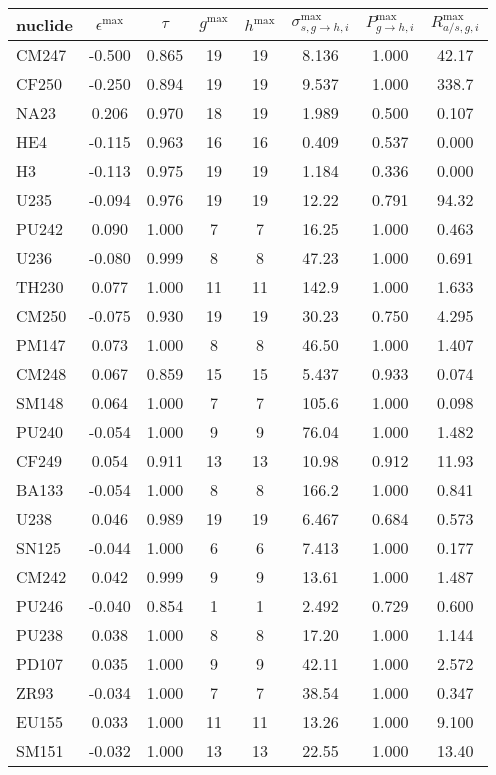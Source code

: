 \begin{tabular}{|l|ccccccc|}
\hline
nuclide & $\epsilon^{\max}$ & $\tau$ & $g^{\max}$ & $h^{\max}$ & $\sigma_{s,g\to h,i}^{\max}$ & $P_{g\to h,i}^{\max}$ & $R_{a/s,g,i}^{\max}$\\
\hline
CM247 & -0.500 & 0.865 & 19 & 19 & 8.136 & 1.000 & 42.17\\
CF250 & -0.250 & 0.894 & 19 & 19 & 9.537 & 1.000 & 338.7\\
NA23 & 0.206 & 0.970 & 18 & 19 & 1.989 & 0.500 & 0.107\\
HE4 & -0.115 & 0.963 & 16 & 16 & 0.409 & 0.537 & 0.000\\
H3 & -0.113 & 0.975 & 19 & 19 & 1.184 & 0.336 & 0.000\\
U235 & -0.094 & 0.976 & 19 & 19 & 12.22 & 0.791 & 94.32\\
PU242 & 0.090 & 1.000 & 7 & 7 & 16.25 & 1.000 & 0.463\\
U236 & -0.080 & 0.999 & 8 & 8 & 47.23 & 1.000 & 0.691\\
TH230 & 0.077 & 1.000 & 11 & 11 & 142.9 & 1.000 & 1.633\\
CM250 & -0.075 & 0.930 & 19 & 19 & 30.23 & 0.750 & 4.295\\
PM147 & 0.073 & 1.000 & 8 & 8 & 46.50 & 1.000 & 1.407\\
CM248 & 0.067 & 0.859 & 15 & 15 & 5.437 & 0.933 & 0.074\\
SM148 & 0.064 & 1.000 & 7 & 7 & 105.6 & 1.000 & 0.098\\
PU240 & -0.054 & 1.000 & 9 & 9 & 76.04 & 1.000 & 1.482\\
CF249 & 0.054 & 0.911 & 13 & 13 & 10.98 & 0.912 & 11.93\\
BA133 & -0.054 & 1.000 & 8 & 8 & 166.2 & 1.000 & 0.841\\
U238 & 0.046 & 0.989 & 19 & 19 & 6.467 & 0.684 & 0.573\\
SN125 & -0.044 & 1.000 & 6 & 6 & 7.413 & 1.000 & 0.177\\
CM242 & 0.042 & 0.999 & 9 & 9 & 13.61 & 1.000 & 1.487\\
PU246 & -0.040 & 0.854 & 1 & 1 & 2.492 & 0.729 & 0.600\\
PU238 & 0.038 & 1.000 & 8 & 8 & 17.20 & 1.000 & 1.144\\
PD107 & 0.035 & 1.000 & 9 & 9 & 42.11 & 1.000 & 2.572\\
ZR93 & -0.034 & 1.000 & 7 & 7 & 38.54 & 1.000 & 0.347\\
EU155 & 0.033 & 1.000 & 11 & 11 & 13.26 & 1.000 & 9.100\\
SM151 & -0.032 & 1.000 & 13 & 13 & 22.55 & 1.000 & 13.40\\

\end{tabular}
